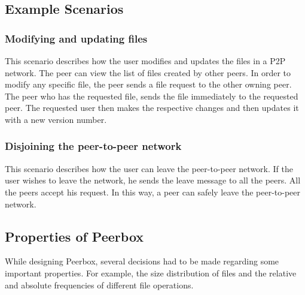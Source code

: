 
\subsection{Example Scenarios}


\subsubsection{Modifying and updating files}
This scenario describes how the user modifies and updates the files in a P2P network. The peer can view the list of files created by other peers. In order to modify any specific file, the peer sends a file request to the other owning peer. The peer who has the requested file, sends the file immediately to the requested peer. The requested user then makes the respective changes and then updates it with a new version number.  

\subsubsection{Disjoining the peer-to-peer network}
This scenario describes how the user can leave the peer-to-peer network. If the user wishes to leave the network, he sends the leave message to all the peers. All the peers accept his request. In this way, a peer can safely leave the peer-to-peer network.

\subsection{Properties of Peerbox}



While designing Peerbox, several decisions had to be made regarding some important properties. For example, the size distribution of files and the relative and absolute frequencies of different file operations.

